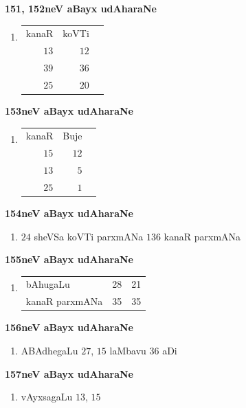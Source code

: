 \begin{minipage}{7cm}
\textbf{\large 151, 152neV aBayx udAharaNe}
\begin{enumerate}[$(1)$]
\item 
\begin{tabular}[t]{rrr}
     kanaR & koVTi \\
     $13$ & $12$ \\
     $39$ & $36$\\
     $25$ & $20$
\end{tabular}
\end{enumerate}
\end{minipage}
\begin{minipage}{7cm}
\textbf{\large 153neV aBayx udAharaNe}
\begin{enumerate}[$(1)$]
\item 
\begin{tabular}[t]{rrr}
     kanaR & Buje \\
     $15$ & $12$ \\
     $13$ & $5$\\
     $25$ & $1$
\end{tabular}
\end{enumerate}
\end{minipage}

\medskip
\begin{minipage}{7cm}
\textbf{\large 154neV aBayx udAharaNe}
\begin{enumerate}[$(1)$]
\item $24$ sheVSa koVTi parxmANa $136$ kanaR parxmANa
\end{enumerate}
\end{minipage}
\begin{minipage}{7cm}
\textbf{\large 155neV aBayx udAharaNe}
\begin{enumerate}[$(1)$]
\item 
\begin{tabular}[t]{lrr}
bAhugaLu & 28 & 21\\
kanaR parxmANa & 35 & 35
\end{tabular}
\end{enumerate}
\end{minipage}

\medskip
\begin{minipage}{7cm}
\textbf{\large 156neV aBayx udAharaNe}
\begin{enumerate}[$(1)$]
\item ABAdhegaLu $27$, $15$ laMbavu $36$ aDi
\end{enumerate}
\end{minipage}
\begin{minipage}{7cm}
\textbf{\large 157neV aBayx udAharaNe}
\begin{enumerate}[$(1)$]
\item vAyxsagaLu $13$, $15$
\end{enumerate}
\end{minipage}

